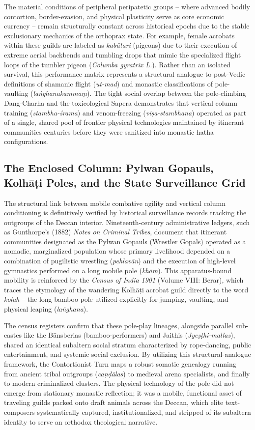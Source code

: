 \documentclass[11pt,twoside,letterpaper]{article}
\begin{document}
The material conditions of peripheral peripatetic groups -- where advanced bodily contortion, border-evasion, and physical plasticity serve as core economic currency -- remain structurally constant across historical epochs due to the stable exclusionary mechanics of the orthoprax state. For example, female acrobats within these guilds are labeled as \textit{kabūtari} (pigeons) due to their execution of extreme aerial backbends and tumbling drops that mimic the specialized flight loops of the tumbler pigeon (\textit{Columba gyratrix L.}). Rather than an isolated survival, this performance matrix represents a structural analogue to post-Vedic definitions of shamanic flight (\textit{ut-mad}) and monastic classifications of pole-vaulting (\textit{laṅghanakammaṃ}). The tight social overlap between the pole-climbing Dang-Charha and the toxicological Sapera demonstrates that vertical column training (\textit{stambha-śrama}) and venom-freezing (\textit{viṣa-stambhana}) operated as part of a single, shared pool of frontier physical technologies maintained by itinerant communities centuries before they were sanitized into monastic hatha configurations.

\subsection{The Enclosed Column: Pylwan Gopauls, Kolhāṭi Poles, and the State Surveillance Grid}

The structural link between mobile combative agility and vertical column conditioning is definitively verified by historical surveillance records tracking the outgroups of the Deccan interior. Nineteenth-century administrative ledgers, such as Gunthorpe’s (1882) \textit{Notes on Criminal Tribes}, document that itinerant communities designated as the Pylwan Gopauls (Wrestler Gopals) operated as a nomadic, marginalized population whose primary livelihood depended on a combination of pugilistic wrestling (\textit{pehlavān}) and the execution of high-level gymnastics performed on a long mobile pole (\textit{khām}). This apparatus-bound mobility is reinforced by the \textit{Census of India 1901} (Volume VIII: Berar), which traces the etymology of the wandering Kolhāṭi acrobat guild directly to the word \textit{kolah} -- the long bamboo pole utilized explicitly for jumping, vaulting, and physical leaping (\textit{laṅghana}). 

The census registers confirm that these pole-play lineages, alongside parallel sub-castes like the Bānsberias (bamboo-performers) and Jaithis (\textit{Jyeṣṭhi-mallas}), shared an identical subaltern social stratum characterized by rope-dancing, public entertainment, and systemic social exclusion. By utilizing this structural-analogue framework, the Contortionist Turn maps a robust somatic genealogy running from ancient tribal outgroups (\textit{caṇḍālas}) to medieval arena specialists, and finally to modern criminalized clusters. The physical technology of the pole did not emerge from stationary monastic reflection; it was a mobile, functional asset of traveling guilds packed onto draft animals across the Deccan, which elite text-composers systematically captured, institutionalized, and stripped of its subaltern identity to serve an orthodox theological narrative.
\end{document}
